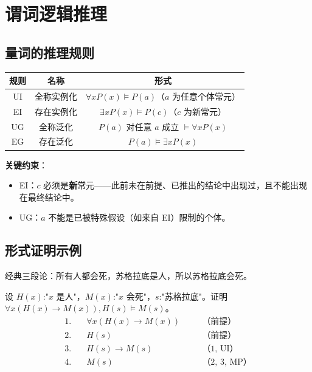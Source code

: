 \section{谓词逻辑推理}

\subsection{量词的推理规则}

\begin{center}
\begin{tabular}{c|c|c}
\toprule
规则 & 名称 & 形式 \\
\midrule
UI & 全称实例化 & $\forall x P(x) \models P(a)$（$a$ 为任意个体常元）\\
EI & 存在实例化 & $\exists x P(x) \models P(c)$（$c$ 为新常元）\\
UG & 全称泛化 & $P(a)$ 对任意 $a$ 成立 $\models \forall x P(x)$\\
EG & 存在泛化 & $P(a) \models \exists x P(x)$\\
\bottomrule
\end{tabular}
\end{center}

\textbf{关键约束}：
\begin{itemize}
\item EI：$c$ 必须是\textbf{新}常元——此前未在前提、已推出的结论中出现过，且不能出现在最终结论中。
\item UG：$a$ 不能是已被特殊假设（如来自 EI）限制的个体。
\end{itemize}

\subsection{形式证明示例}

\begin{example}
经典三段论：所有人都会死，苏格拉底是人，所以苏格拉底会死。

设 $H(x)$:"$x$ 是人"，$M(x)$:"$x$ 会死"，$s$:"苏格拉底"。证明 $\forall x (H(x) \rightarrow M(x)), H(s) \models M(s)$。
\[
\begin{aligned}
1.\quad &\forall x (H(x) \rightarrow M(x)) &\quad &\text{（前提）} \\
2.\quad &H(s) &\quad &\text{（前提）} \\
3.\quad &H(s) \rightarrow M(s) &\quad &\text{（1, UI）} \\
4.\quad &M(s) &\quad &\text{（2, 3, MP）}
\end{aligned}
\]
\end{example}

